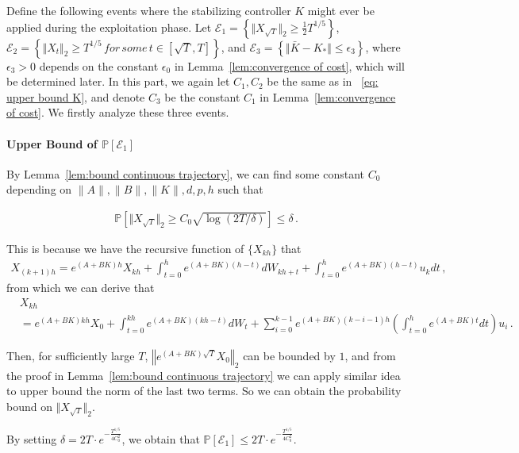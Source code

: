 \documentclass{article}
\theoremstyle{definition}
\begin{document}
Define the following events where the stabilizing controller $K$ might ever be applied during the exploitation phase. Let $\mathcal{E}_{1}=\left\{\Vert X_{\sqrt{T}}\Vert_{2}\geq \frac{1}{2}T^{1/5}    \right\}$, $\mathcal{E}_{2}=\left\{ \Vert X_{t}\Vert_{2}\geq T^{1/5}\, for\, some\, t\in[\sqrt{T},T]     \right\}$, and
$\mathcal{E}_{3}=\left\{ \Vert \bar{K}-K_{*}\Vert\leq\epsilon_{3}   \right\}$, where $\epsilon_{3}>0$ depends on the constant $\epsilon_{0}$ in Lemma~\ref{lem:convergence of cost}, which will be determined later. In this part, we again let $C_{1},C_{2}$ be the same as in ~\eqref{eq: upper bound K}, and denote $C_{3}$ be the constant $C_{1}$ in Lemma~\ref{lem:convergence of cost}. We firstly analyze these three events.

\paragraph{Upper Bound of $\mathbb{P}[\mathcal{E}_{1}]$}
By Lemma~\ref{lem:bound continuous trajectory}, we can find some constant $C_{0}$ depending on $\|A\|,\|B\|,\|K\|,d,p,h$ such that 

\begin{align*}
\mathbb{P}\left[\Vert X_{\sqrt{T}}\Vert_{2}\geq C_{0}\sqrt{\log(2T/\delta)}     \right]\leq \delta\,.
\end{align*}

This is because we have the recursive function of $\{X_{kh}\}$ that
\begin{align*}
X_{(k+1)h}=e^{(A+BK)h}X_{kh}+\int_{t=0}^{h}e^{(A+BK)(h-t)}dW_{kh+t}+\int_{t=0}^{h}e^{(A+BK)(h-t)}u_{k}dt\,,
\end{align*}
from which we can derive that
\begin{align*}
&X_{kh}\\&=e^{(A+BK)kh}X_{0}+\int_{t=0}^{kh}e^{(A+BK)(kh-t)}dW_{t}+\sum_{i=0}^{k-1}e^{(A+BK)(k-i-1)h}\left(\int_{t=0}^{h}e^{(A+BK)t}dt\right)u_{i}\,.
\end{align*}

Then, for sufficiently large $T$, $\left\Vert e^{(A+BK)\sqrt{T}} X_{0}\right\Vert_{2}$ can be bounded by $1$, and from the proof in Lemma~\ref{lem:bound continuous trajectory} we can apply similar idea to upper bound the norm of the last two terms. So we can obtain the probability bound on $\Vert X_{\sqrt{T}}\Vert_{2}$.

By setting $\delta=2T\cdot e^{-\frac{T^{1/5}}{4C_{0}^{2}}}$, we obtain that $\mathbb{P}[\mathcal{E}_{1}]\leq 2T\cdot e^{-\frac{T^{1/5}}{4C_{0}^{2}}}$.
\end{document}
